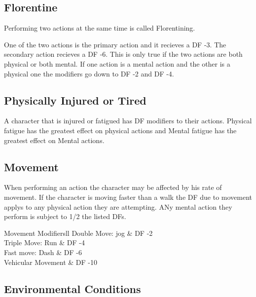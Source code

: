 \subsection{Florentine}

Performing two actions at the same time is called Florentining.

One of the two actions is the primary action and it recieves a 
DF -3. The secondary action recieves a DF -6. This is only true 
if the two actions are both physical or both mental. If one 
action is a mental action and the other is a physical one the modifiers
go down to DF -2 and DF -4.



\subsection{Physically Injured or Tired}

A character that is injured or fatigued has DF modifiers to 
their actions. Physical fatigue has the greatest effect on physical actions 
and Mental fatigue has the greatest effect on Mental actions.




\subsection{Movement} 

When performing an action the character may be affected by 
his rate of movement. If the character is moving faster than a 
walk the DF due to movement applys to any physical action they are 
attempting. ANy mental action they perform is subject to 1/2 
the listed DFs.

\begin{stable}{Movement Modifiers}{ll}
	Double Move: jog							  & DF -2 \\
	Triple Move: Run							  & DF -4 \\
	Fast move: Dash							 & DF -6\\
	Vehicular Movement							& DF -10 \\ 
\end{stable}

\subsection{Environmental Conditions}

